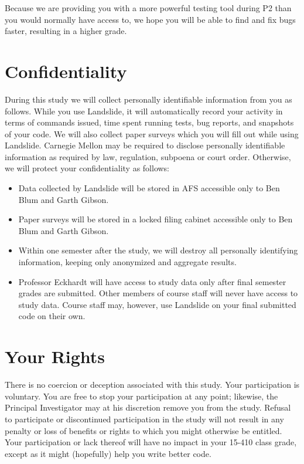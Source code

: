 \documentclass{article}
\begin{document}
Because we are providing you with a more powerful testing tool during P2 than you would normally have access to, we hope you will be able to find and fix bugs faster, resulting in a higher grade.
%

\section{Confidentiality}

During this study we will collect personally identifiable information from you as follows. While you use Landslide, it will automatically record your activity in terms of commands issued, time spent running tests, bug reports, and snapshots of your code. We will also collect paper surveys which you will fill out while using Landslide.
Carnegie Mellon may be required to disclose personally identifiable information as required by law, regulation, subpoena or court order.
Otherwise, we will protect your confidentiality as follows:

\begin{itemize}
	\item Data collected by Landslide will be stored in AFS accessible only to Ben Blum and Garth Gibson.
	\item Paper surveys will be stored in a locked filing cabinet accessible only to Ben Blum and Garth Gibson.
	\item Within one semester after the study, we will destroy all personally identifying information, keeping only anonymized and aggregate results.
	\item Professor Eckhardt will have access to study data only after final semester grades are submitted. Other members of course staff will never have access to study data. Course staff may, however, use Landslide on your final submitted code on their own.
\end{itemize}

\section{Your Rights}
There is no coercion or deception associated with this study.
Your participation is voluntary.
You are free to stop your participation at any point; likewise, the Principal Investigator may at his discretion remove you from the study.
Refusal to participate or discontinued participation in the study will not result in any penalty or loss of benefits or rights to which you might otherwise be entitled.
Your participation or lack thereof will have no impact in your 15-410 class grade, except as it might (hopefully) help you write better code.
\\
\end{document}
